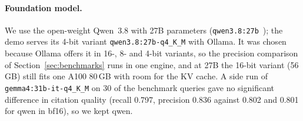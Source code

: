 \paragraph{Foundation model.}
We use the open-weight Qwen~3.8 with 27B parameters (\texttt{qwen3.8:27b}~\cite{ollama_qwen38}); the demo serves its 4-bit variant \texttt{qwen3.8:27b-q4\_K\_M} with Ollama.
It was chosen because Ollama offers it in 16-, 8- and 4-bit variants, so the precision comparison of Section~\ref{sec:benchmarks} runs in one engine, and at 27B the 16-bit variant (56\,GB) still fits one A100 80\,GB with room for the KV cache.
A side run of \texttt{gemma4:31b-it-q4\_K\_M} on 30 of the benchmark queries gave no significant difference in citation quality (recall 0.797, precision 0.836 against 0.802 and 0.801 for qwen in bf16), so we kept qwen.
